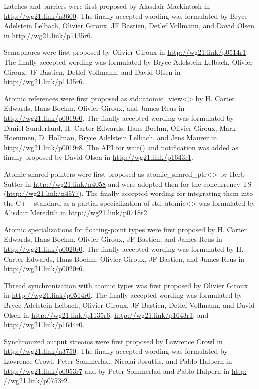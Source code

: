 Latches and barriers were first proposed by Alasdair Mackintosh in \url{http://wg21.link/n3600}. The finally accepted wording was formulated by Bryce Adelstein Lelbach, Olivier Giroux, JF Bastien, Detlef Vollmann, and David Olsen in \url{http://wg21.link/p1135r6}.

Semaphores were first proposed by Olivier Giroux in \url{http://wg21.link/p0514r1}. The finally accepted wording was formulated by Bryce Adelstein Lelbach, Olivier Giroux, JF Bastien, Detlef Vollmann, and David Olsen in \url{http://wg21.link/p1135r6}.

Atomic references were first proposed as std::atomic\_view<> by H. Carter Edwards, Hans Boehm, Olivier Giroux, and James Reus in \url{http://wg21.link/p0019r0}. The finally accepted wording was formulated by Daniel Sunderland, H. Carter Edwards, Hans Boehm, Olivier Giroux, Mark Hoemmen, D. Hollman, Bryce Adelstein Lelbach, and Jens Maurer in \url{http://wg21.link/p0019r8}. The API for wait() and notification was added as finally proposed by David Olsen in \url{http://wg21.link/p1643r1}.

Atomic shared pointers were first proposed as atomic\_shared\_ptr<> by Herb Sutter in \url{http://wg21.link/n4058} and were adopted then for the concurrency TS (\url{http://wg21.link/n4577}). The finally accepted wording for integrating them into the C++ standard as a partial specialization of std::atomic<> was formulated by Alisdair Meredith in \url{http://wg21.link/p0718r2}.

Atomic specializations for floating-point types were first proposed by H. Carter Edwards, Hans Boehm, Olivier Giroux, JF Bastien, and James Reus in \url{http://wg21.link/p0020r0}. The finally accepted wording was formulated by H. Carter Edwards, Hans Boehm, Olivier Giroux, JF Bastien, and James Reus in \url{http://wg21.link/p0020r6}.

Thread synchronization with atomic types was first proposed by Olivier Giroux in \url{http://wg21.link/p0514r0}. The finally accepted wording was formulated by Bryce Adelstein Lelbach, Olivier Giroux, JF Bastien, Detlef Vollmann, and David Olsen in \url{http://wg21.link/p1135r6}, \url{http://wg21.link/p1643r1}, and \url{http://wg21.link/p1644r0}.

Synchronized output streams were first proposed by Lawrence Crowl in \url{http://wg21.link/n3750}. The finally accepted wording was formulated by Lawrence Crowl, Peter Sommerlad, Nicolai Josuttis, and Pablo Halpern in \url{http://wg21.link/p0053r7} and by Peter Sommerlad and Pablo Halpern in \url{http: //wg21.link/p0753r2}.

